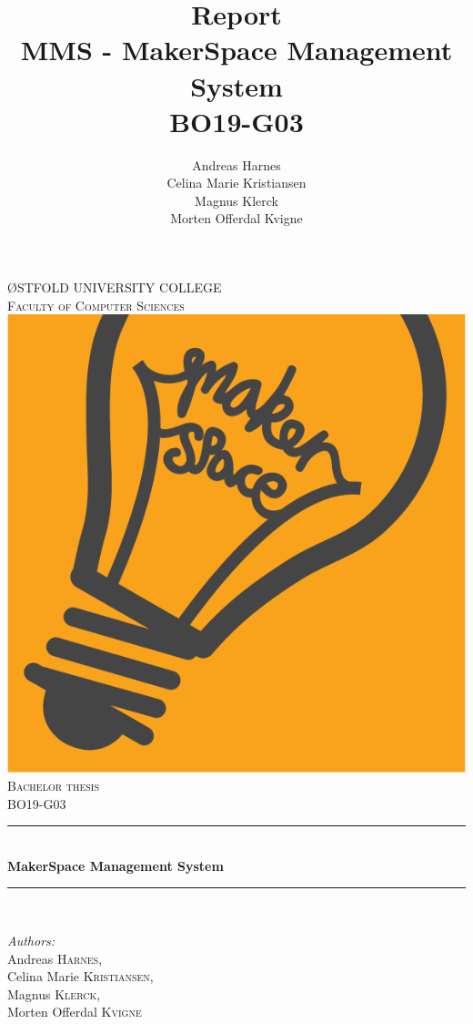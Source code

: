 \documentclass[12pt]{report}
\title {
    Report \\
    MMS - MakerSpace Management System \\
    BO19-G03
}
\author {
    Andreas Harnes \\
    Celina Marie Kristiansen \\
    Magnus Klerck \\
    Morten Offerdal Kvigne
}
\begin{document}
\begin{titlepage}

\newcommand{\HRule}{\rule{\linewidth}{0.5mm}} %

\center %

\textsc{\LARGE ØSTFOLD UNIVERSITY COLLEGE}\\[0.5cm] %
\textsc{\Large Faculty of Computer Sciences}\\[1.0cm]
\includegraphics[scale=.1]{images/makerspace_logo.png}\\[1cm] %

\textsc{\Large Bachelor thesis}\\[0.5cm]
\textsc{\large BO19-G03}\\[0.5cm] %

\HRule \\[0.4cm]
{ \huge \bfseries MakerSpace Management System}\\%
\HRule \\[1.5cm]
 
\begin{minipage}{0.8\textwidth}
\begin{flushleft} \large
\emph{Authors:}\\
Andreas \textsc{Harnes},\\
Celina Marie \textsc{Kristiansen},\\
Magnus \textsc{Klerck},\\
Morten Offerdal \textsc{Kvigne}\\%
\end{flushleft}


\end{minipage}
\end{titlepage}
\end{document}
